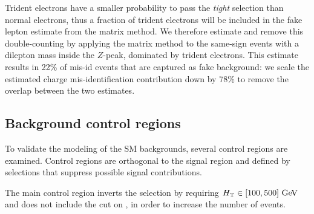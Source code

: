 Trident electrons have a smaller probability to pass the {\it tight} selection than normal electrons, 
thus a fraction of trident electrons will be included in the fake lepton estimate from the matrix method.
We therefore estimate and remove this double-counting by applying the matrix method to the same-sign
events with a dilepton mass inside
the $Z$-peak, dominated by trident electrons. This estimate results in 22\% of mis-id events that
are captured as fake background: we scale the estimated charge mis-identification 
contribution down by 78\% to remove the overlap between the two estimates.

\subsection{Background control regions}
To validate the modeling of the SM backgrounds, several control regions are
examined. Control regions are orthogonal to the signal region and defined by selections that
suppress possible signal contributions.

The main control region inverts the \HT{} selection by requiring $\HT{} \in [100,500] \GeV$ and
does not include the cut on \met{}, in order to increase the number of events. 

